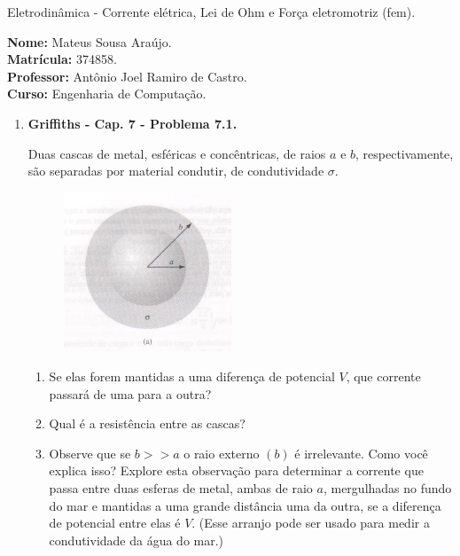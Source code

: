 \documentclass[11pt,a4paper]{article}
\begin{document}
	\begin{center}
		\Large Eletrodinâmica - Corrente elétrica, Lei de Ohm e Força eletromotriz (fem). 
	\end{center}

\begin{flushleft}
\textbf{Nome:} Mateus Sousa Araújo. \\
\textbf{Matrícula:} 374858. \\
\textbf{Professor:} Antônio Joel Ramiro de Castro. \\
\textbf{Curso:} Engenharia de Computação. \\
\end{flushleft}

\begin{enumerate}

\item \textbf{Griffiths - Cap. 7 - Problema 7.1.}

Duas cascas de metal, esféricas e concêntricas, de raios $a$ e $b$, respectivamente, são separadas por material condutir, de condutividade $\sigma$.

\begin{figure}[h]	
\centering %
\includegraphics[width=5cm]{Selection_092.jpg} 
\end{figure}

\begin{enumerate}
\item Se elas forem mantidas a uma diferença de potencial $V$, que corrente passará de uma para a outra?
\item Qual é a resistência entre as cascas?
\item Observe que se $b>>a$ o raio externo $(b)$ é irrelevante. Como você explica isso? Explore esta observação para determinar a corrente que passa entre duas esferas de metal, ambas de raio $a$, mergulhadas no fundo do mar e mantidas a uma grande distância uma da outra, se a diferença de potencial entre elas é $V$. (Esse arranjo pode ser usado para medir a condutividade da água do mar.)


\end{enumerate}
\end{enumerate}
\end{document}

